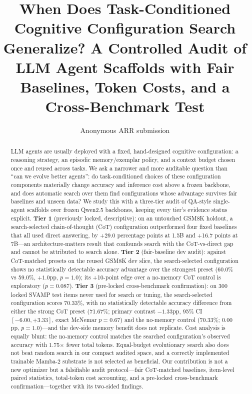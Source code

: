 \documentclass[11pt]{article}
\title{When Does Task-Conditioned Cognitive Configuration Search\\
Generalize? A Controlled Audit of LLM Agent Scaffolds with Fair\\
Baselines, Token Costs, and a Cross-Benchmark Test}
\author{Anonymous ARR submission}
\date{}
\begin{document}
\maketitle

\begin{abstract}
LLM agents are usually deployed with a fixed, hand-designed cognitive
configuration: a reasoning strategy, an episodic memory/exemplar policy,
and a context budget chosen once and reused across tasks. We ask a narrower
and more auditable question than ``can we evolve better agents'': do
task-conditioned choices of these configuration components materially
change accuracy and inference cost above a frozen backbone, and does
automatic search over them find configurations whose advantage survives
fair baselines and unseen data? We study this with a three-tier audit of
QA-style single-agent scaffolds over frozen Qwen2.5 backbones, keeping
every tier's evidence status explicit. \textbf{Tier 1} (previously locked,
descriptive): on an untouched GSM8K holdout, a search-selected
chain-of-thought (CoT) configuration outperformed four fixed baselines that
all used direct answering, by +29.0 percentage points at 1.5B and +16.7
points at 7B---an architecture-matters result that confounds search with
the CoT-vs-direct gap and cannot be attributed to search alone.
\textbf{Tier 2} (fair-baseline dev audit): against CoT-matched presets on
the reused GSM8K dev slice, the search-selected configuration shows no
statistically detectable accuracy advantage over the strongest preset
(60.0\% vs 59.0\%, $+1.0$pp, $p{=}1.0$); its +10-point edge over a
no-memory CoT control is exploratory ($p{=}0.087$). \textbf{Tier 3}
(pre-locked cross-benchmark confirmation): on 300 locked SVAMP test items
never used for search or tuning, the search-selected configuration scores
70.33\%, with no statistically detectable accuracy difference from either
the strong CoT preset
(71.67\%; primary contrast $-1.33$pp, 95\% CI $[-6.00, +3.33]$, exact
McNemar $p{=}0.67$) and the no-memory control (70.33\%; $0.00$pp,
$p{=}1.0$)---and the dev-side memory benefit does not replicate. Cost
analysis is equally blunt: the no-memory control matches the searched
configuration's observed accuracy with 1.75$\times$ fewer total tokens.
Equal-budget evolutionary search also does not beat random search in our
compact audited space, and a correctly implemented trainable Mamba-2
substrate is not selected as beneficial. Our contribution is not a new
optimizer but a falsifiable audit protocol---fair CoT-matched baselines,
item-level paired statistics, total-token cost accounting, and a pre-locked
cross-benchmark confirmation---together with its two-sided findings.
\end{abstract}
\end{document}

